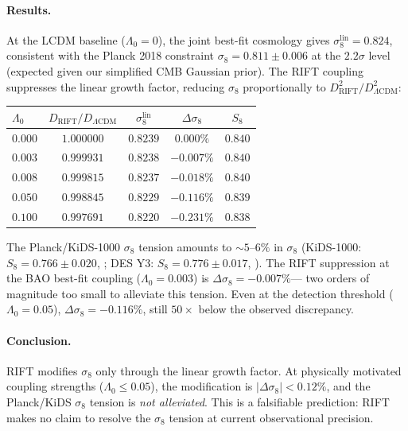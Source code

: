 \documentclass[12pt,a4paper]{article}
\begin{document}
\paragraph{Results.} At the LCDM baseline ($\Lambda_0=0$), the joint best-fit
cosmology gives $\sigma_8^{\mathrm{lin}} = 0.824$, consistent with the Planck
2018 constraint $\sigma_8 = 0.811 \pm 0.006$ \citep{Planck2020} at the
$2.2\sigma$ level (expected given our simplified CMB Gaussian prior). The
RIFT coupling suppresses the linear growth factor, reducing $\sigma_8$
proportionally to $D_{\mathrm{RIFT}}^2/D_{\Lambda\mathrm{CDM}}^2$:
\begin{center}
\begin{tabular}{lcccc}
\toprule
$\Lambda_0$ & $D_{\mathrm{RIFT}}/D_{\Lambda\mathrm{CDM}}$ & $\sigma_8^{\mathrm{lin}}$
  & $\Delta\sigma_8$ & $S_8$ \\
\midrule
$0.000$ & $1.000000$ & $0.8239$ & $0.000\%$  & $0.840$ \\
$0.003$ & $0.999931$ & $0.8238$ & $-0.007\%$ & $0.840$ \\
$0.008$ & $0.999815$ & $0.8237$ & $-0.018\%$ & $0.840$ \\
$0.050$ & $0.998845$ & $0.8229$ & $-0.116\%$ & $0.839$ \\
$0.100$ & $0.997691$ & $0.8220$ & $-0.231\%$ & $0.838$ \\
\bottomrule
\end{tabular}
\end{center}
The Planck/KiDS-1000 $\sigma_8$ tension amounts to $\sim 5$--$6\%$ in $\sigma_8$
(KiDS-1000: $S_8 = 0.766 \pm 0.020$, \citealt{Asgari2021}; DES Y3:
$S_8 = 0.776 \pm 0.017$, \citealt{Abbott2022}). The RIFT suppression at the
BAO best-fit coupling ($\Lambda_0 = 0.003$) is $\Delta\sigma_8 = -0.007\%$---
two orders of magnitude too small to alleviate this tension. Even at the
detection threshold ($\Lambda_0 = 0.05$), $\Delta\sigma_8 = -0.116\%$, still
$50\times$ below the observed discrepancy.

\paragraph{Conclusion.} RIFT modifies $\sigma_8$ only through the linear growth
factor. At physically motivated coupling strengths ($\Lambda_0 \leq 0.05$), the
modification is $|\Delta\sigma_8| < 0.12\%$, and the Planck/KiDS $\sigma_8$
tension is \emph{not alleviated}. This is a falsifiable prediction: RIFT makes
no claim to resolve the $\sigma_8$ tension at current observational precision.
\end{document}
